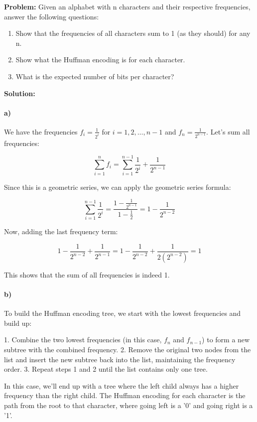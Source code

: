 \documentclass[11pt]{article}
\begin{document}
    \textbf{Problem:} Given an alphabet with n characters and their respective frequencies, answer the following questions:

    \begin{enumerate}
        \item Show that the frequencies of all characters sum to 1 (as they should) for any n.
        \item Show what the Huffman encoding is for each character.
        \item What is the expected number of bits per character?
    \end{enumerate}

    \textbf{Solution:}

    \paragraph{a)} We have the frequencies $f_i = \frac{1}{2^i}$ for $i = 1, 2, \dots, n-1$ and $f_n = \frac{1}{2^{n-1}}$. Let's sum all frequencies:

    \[
        \sum_{i=1}^n f_i = \sum_{i=1}^{n-1} \frac{1}{2^i} + \frac{1}{2^{n-1}}
    \]

    Since this is a geometric series, we can apply the geometric series formula:

    \[
        \sum_{i=1}^{n-1} \frac{1}{2^i} = \frac{1 - \frac{1}{2^{n-1}}}{1 - \frac{1}{2}} = 1 - \frac{1}{2^{n-2}}
    \]

    Now, adding the last frequency term:

    \[
        1 - \frac{1}{2^{n-2}} + \frac{1}{2^{n-1}} = 1 - \frac{1}{2^{n-2}} + \frac{1}{2(2^{n-2})} = 1
    \]

    This shows that the sum of all frequencies is indeed 1.

    \paragraph{b)} To build the Huffman encoding tree, we start with the lowest frequencies and build up:

    1. Combine the two lowest frequencies (in this case, $f_n$ and $f_{n-1}$) to form a new subtree with the combined frequency.
    2. Remove the original two nodes from the list and insert the new subtree back into the list, maintaining the frequency order.
    3. Repeat steps 1 and 2 until the list contains only one tree.

    In this case, we'll end up with a tree where the left child always has a higher frequency than the right child. The Huffman encoding for each character is the path from the root to that character, where going left is a '0' and going right is a '1'.
\end{document}
